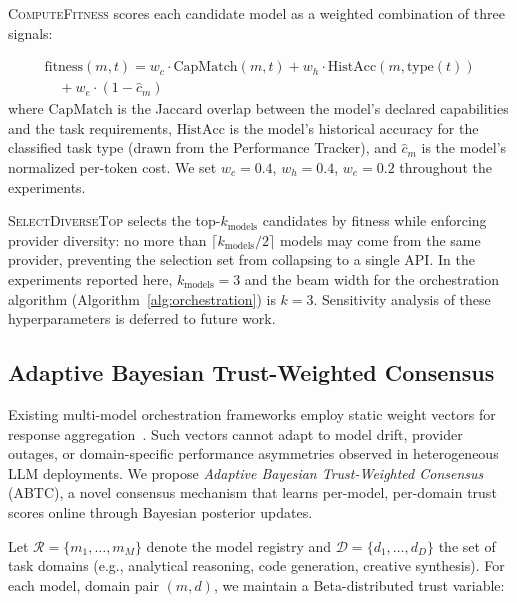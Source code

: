 \documentclass{iopjournal}
\begin{document}
\noindent\textsc{ComputeFitness} scores each candidate model as a weighted combination of three signals:


\begin{equation}
\begin{split}
\text{fitness}(m, t) = w_c \cdot \text{CapMatch}(m, t) + w_h \cdot \text{HistAcc}(m, \text{type}(t)) \\
 \quad + w_e \cdot (1 - \hat{c}_m)
\end{split}
\label{eq:fitness}
\end{equation}
where $\text{CapMatch}$ is the Jaccard overlap between the model's declared capabilities and the task requirements, $\text{HistAcc}$ is the model's historical accuracy for the classified task type (drawn from the Performance Tracker), and $\hat{c}_m$ is the model's normalized per-token cost. We set $w_c = 0.4$, $w_h = 0.4$, $w_e = 0.2$ throughout the experiments.

\noindent\textsc{SelectDiverseTop} selects the top-$k_{\text{models}}$ candidates by fitness while enforcing provider diversity: no more than $\lceil k_{\text{models}}/2 \rceil$ models may come from the same provider, preventing the selection set from collapsing to a single API. In the experiments reported here, $k_{\text{models}} = 3$ and the beam width for the orchestration algorithm (Algorithm~\ref{alg:orchestration}) is $k = 3$. Sensitivity analysis of these hyperparameters is deferred to future work.

\subsection{Adaptive Bayesian Trust-Weighted Consensus}
\label{sec:abtc}

Existing multi-model orchestration frameworks employ static weight vectors for response aggregation~\cite{AutoGen, MACollab}. Such vectors cannot adapt to model drift, provider outages, or domain-specific performance asymmetries observed in heterogeneous LLM deployments. We propose \emph{Adaptive Bayesian Trust-Weighted Consensus} (ABTC), a novel consensus mechanism that learns per-model, per-domain trust scores online through Bayesian posterior updates.

Let $\mathcal{R} = \{m_1, \ldots, m_M\}$ denote the model registry and $\mathcal{D} = \{d_1, \ldots, d_D\}$ the set of task domains (e.g., analytical reasoning, code generation, creative synthesis). For each model, domain pair $(m, d)$, we maintain a Beta-distributed trust variable:
\end{document}
